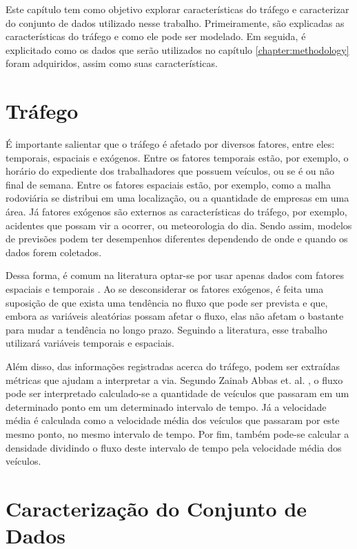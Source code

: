 \label{chapter:data}

Este capítulo tem como objetivo explorar características do tráfego e caracterizar do conjunto de dados utilizado nesse trabalho. Primeiramente, são explicadas as características do tráfego e como ele pode ser modelado. Em seguida, é explicitado como os dados que serão utilizados no capítulo \ref{chapter:methodology} foram adquiridos, assim como suas características. 
\section{Tráfego}

É importante salientar que o tráfego é afetado por diversos fatores, entre eles: temporais, espaciais e exógenos. Entre os fatores temporais estão, por exemplo, o horário do expediente dos trabalhadores que possuem veículos, ou se é ou não final de semana. Entre os fatores espaciais estão, por exemplo, como a malha rodoviária se distribui em uma localização, ou a quantidade de empresas em uma área. Já fatores exógenos são externos as características do tráfego, por exemplo, acidentes que possam vir a ocorrer, ou meteorologia do dia. Sendo assim, modelos de previsões podem ter desempenhos diferentes dependendo de onde e quando os dados forem coletados.

Dessa forma, é comum na literatura optar-se por usar apenas dados com fatores espaciais e temporais \cite{lana_2018}. Ao se desconsiderar os fatores exógenos, é feita uma suposição de que exista uma tendência no fluxo que pode ser prevista e que, embora as variáveis aleatórias possam afetar o fluxo, elas não afetam o bastante para mudar a tendência no longo prazo. Seguindo a literatura, esse trabalho utilizará variáveis temporais e espaciais. 

Além disso, das informações registradas acerca do tráfego, podem ser extraídas métricas que ajudam a interpretar a via. Segundo Zainab Abbas et. al. \cite{Zainab_2018} , o fluxo pode ser interpretado calculado-se a quantidade de veículos que passaram em um determinado ponto em um determinado intervalo de tempo. Já a velocidade média é calculada como a velocidade média dos veículos que passaram por este mesmo ponto, no mesmo intervalo de tempo. Por fim, também pode-se calcular a densidade dividindo o fluxo deste intervalo de tempo pela velocidade média dos veículos.

\section{Caracterização do Conjunto de Dados}

